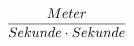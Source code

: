 \documentclass[preview]{standalone}
\begin{document}
\begin{align*}
\special{dvisvgm:raw <g id='unique000'>}\frac{Meter}{Sekunde \cdot  Sekunde}\special{dvisvgm:raw </g>}
\end{align*}
\end{document}
